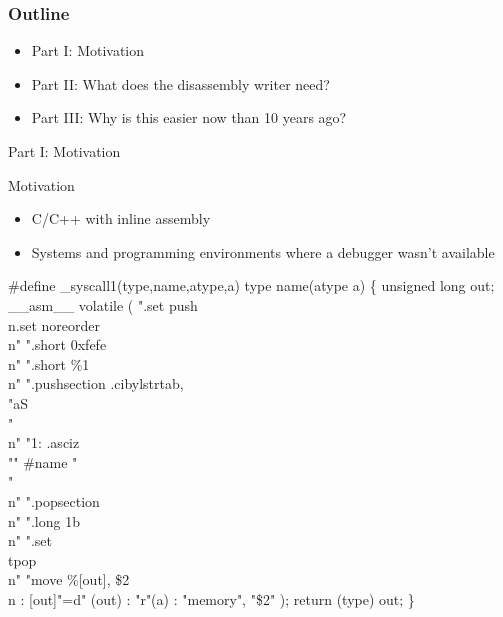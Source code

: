 \documentclass{beamer}
\begin{document}
\begin{frame}
  \frametitle{Outline}
    \begin{itemize}
      \item Part I: Motivation
      \item Part II: What does the disassembly writer need?
      \item Part III: Why is this easier now than 10 years ago?
    \end{itemize}
  \end{frame}

\begin{frame}{Part I: Motivation}
\end{frame}

\begin{frame}[fragile]{Motivation}
  \begin{itemize}
    \item C/C++ with inline assembly
    \item Systems and programming environments where a debugger wasn't available
  \end{itemize}
  \begin{Example}
    \begin{semiverbatim}
      \scriptsize
\#define \_syscall1(type,name,atype,a) type name(atype a) \{
        unsigned long out;
        \_\_asm\_\_ volatile (
        ".set  push\\n.set  noreorder\\n"
        ".short 0xfefe\\n"
        ".short \%1\\n"
        ".pushsection .cibylstrtab, \\"aS\\"\\n"
        "1: .asciz \\"" \#name "\\"\\n"
        ".popsection\\n"
        ".long 1b\\n"
        ".set\\tpop\\n"
        "move \%[out], \$2\\n
        : [out]"=d" (out)
        : "r"(a)
        : "memory", "\$2"
        );
        return (type) out;
\}
    \end{semiverbatim}
  \end{Example}

\end{frame}
\end{document}
